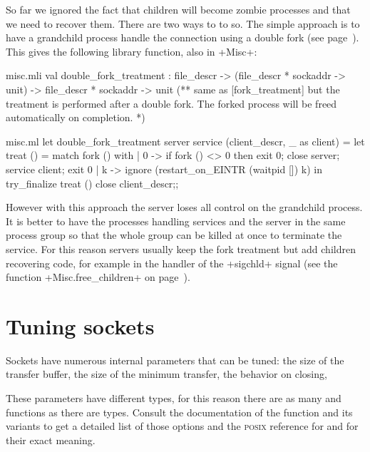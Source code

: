 So far we ignored the fact that children will become zombie processes
and that we need to recover them. There are two ways to to so. The
simple approach is to have a grandchild process handle the connection
using a double fork (see page~\pageref{double-fork}). This gives the
following library function, also in \ml+Misc+:
%
\begin{codefile}{misc.mli}
val double_fork_treatment :
file_descr -> (file_descr * sockaddr -> unit) ->
file_descr * sockaddr -> unit
(** same as [fork_treatment] but the treatment is performed after a double
   fork. The forked process will be freed automatically on
   completion. *)
\end{codefile}
%
\begin{listingcodefile}{misc.ml}
let double_fork_treatment server service (client_descr, _ as client) =
  let treat () = match fork () with
    | 0 ->
        if fork () <> 0 then exit 0;
        close server; service client; exit 0
    | k ->
        ignore (restart_on_EINTR (waitpid []) k)
  in
  try_finalize treat () close client_descr;;
\end{listingcodefile}
% 
However with this approach the server loses all control on the
grandchild process. It is better to have the processes handling
services and the server in the same process group so that the whole
group can be killed at once to terminate the service. For this reason servers
usually keep the fork treatment but add children recovering code, for
example in the handler of the \ml+sigchld+ signal (see the function
\ml+Misc.free_children+ on page~\pageref{ex/childs}).

\section {Tuning sockets}

Sockets have numerous internal parameters that can be tuned: the size
of the transfer buffer, the size of the minimum transfer, the behavior
on closing, \etc{}

These parameters have different types, for this reason there are as
many  and 
\ocaml{} functions as there are types. Consult the \ocaml{}
documentation of the function  and its variants
to get a detailed list of those options and the \textsc{posix}
reference for  and  for their
exact meaning.

